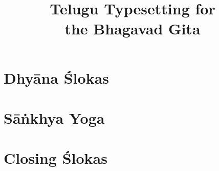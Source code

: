 \documentclass{scrbook}
\title{Telugu Typesetting for \\ the Bhagavad Gita}
\author{}
\begin{document}
\maketitle
\frontmatter

\tableofcontents
\newpage

\chapter{Dhyāna Ślokas}


\mainmatter

\chapter{Sāṅkhya Yoga}


\backmatter
\chapter{Closing Ślokas}

\end{document}
